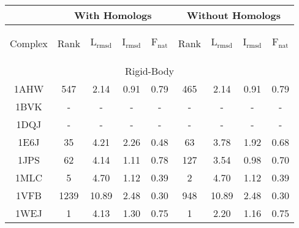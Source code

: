 
\begin{longtable}{c c c c c|c c c c}
& 
\multicolumn{4}{c}{With Homologs} &
\multicolumn{4}{c}{Without Homologs} \\
\hline
\begin{sideways}{Complex}\end{sideways}&\begin{sideways}{Rank}\end{sideways}&\begin{sideways}$\mathrm{L_{rmsd}}$\end{sideways}&\begin{sideways}$\mathrm{I_{rmsd}}$\end{sideways}&\begin{sideways}$\mathrm{F_{nat}}$\end{sideways}&\begin{sideways}{Rank}\end{sideways}&\begin{sideways}$\mathrm{L_{rmsd}}$\end{sideways}&\begin{sideways}$\mathrm{I_{rmsd}}$\end{sideways}&\begin{sideways}$\mathrm{F_{nat}}$\end{sideways}\\ 
 \hline
\multicolumn{9}{c}{Rigid-Body}\\
{\tiny 1AHW} &{\tiny 547}&{\tiny 2.14}&{\tiny 0.91}&{\tiny 0.79} &{\tiny 465}&{\tiny 2.14}&{\tiny 0.91}&{\tiny 0.79}\\ 
 {\tiny 1BVK} &{\tiny -}&{\tiny -}&{\tiny -}&{\tiny -} &{\tiny -}&{\tiny -}&{\tiny -}&{\tiny -}\\ 
 {\tiny 1DQJ} &{\tiny -}&{\tiny -}&{\tiny -}&{\tiny -} &{\tiny -}&{\tiny -}&{\tiny -}&{\tiny -}\\ 
 {\tiny 1E6J} &{\tiny 35}&{\tiny 4.21}&{\tiny 2.26}&{\tiny 0.48} &{\tiny 63}&{\tiny 3.78}&{\tiny 1.92}&{\tiny 0.68}\\ 
 {\tiny 1JPS} &{\tiny 62}&{\tiny 4.14}&{\tiny 1.11}&{\tiny 0.78} &{\tiny 127}&{\tiny 3.54}&{\tiny 0.98}&{\tiny 0.70}\\ 
 {\tiny 1MLC} &{\tiny 5}&{\tiny 4.70}&{\tiny 1.12}&{\tiny 0.39} &{\tiny 2}&{\tiny 4.70}&{\tiny 1.12}&{\tiny 0.39}\\ 
 {\tiny 1VFB} &{\tiny 1239}&{\tiny 10.89}&{\tiny 2.48}&{\tiny 0.30} &{\tiny 948}&{\tiny 10.89}&{\tiny 2.48}&{\tiny 0.30}\\ 
 {\tiny 1WEJ} &{\tiny 1}&{\tiny 4.13}&{\tiny 1.30}&{\tiny 0.75} &{\tiny 1}&{\tiny 2.20}&{\tiny 1.16}&{\tiny 0.75}\\ 

\end{longtable}

